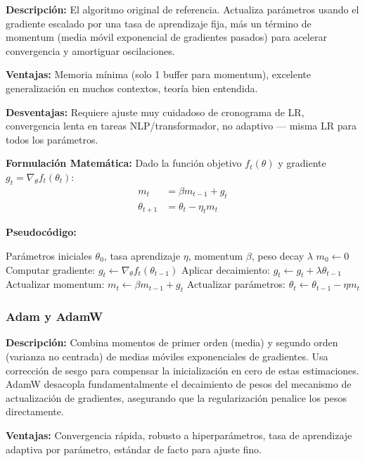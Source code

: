 \documentclass[11pt,a4paper]{article}
\begin{document}
\textbf{Descripción:} El algoritmo original de referencia. Actualiza parámetros usando el gradiente escalado por una tasa de aprendizaje fija, más un término de momentum (media móvil exponencial de gradientes pasados) para acelerar convergencia y amortiguar oscilaciones.

\textbf{Ventajas:} Memoria mínima (solo 1 buffer para momentum), excelente generalización en muchos contextos, teoría bien entendida.

\textbf{Desventajas:} Requiere ajuste muy cuidadoso de cronograma de LR, convergencia lenta en tareas NLP/transformador, no adaptivo — misma LR para todos los parámetros.

\textbf{Formulación Matemática:} Dado la función objetivo $f_t(\theta)$ y gradiente $g_t = \nabla_\theta f_t(\theta_t)$:
\begin{align}
m_t &= \beta m_{t-1} + g_t \\
\theta_{t+1} &= \theta_t - \eta_t m_t
\end{align}

\textbf{Pseudocódigo:}
\begin{algorithm}
\caption{SGD con Momentum}
\begin{algorithmic}[1]
\Require Parámetros iniciales $\theta_0$, tasa aprendizaje $\eta$, momentum $\beta$, peso decay $\lambda$
\State $m_0 \gets 0$
\State Computar gradiente: $g_t \gets \nabla_\theta f_t(\theta_{t-1})$
\State Aplicar decaimiento: $g_t \gets g_t + \lambda \theta_{t-1}$
\State Actualizar momentum: $m_t \gets \beta m_{t-1} + g_t$
\State Actualizar parámetros: $\theta_t \gets \theta_{t-1} - \eta m_t$
\EndFor
\end{algorithmic}
\end{algorithm}

\subsubsection{Adam y AdamW}

\textbf{Descripción:} Combina momentos de primer orden (media) y segundo orden (varianza no centrada) de medias móviles exponenciales de gradientes. Usa corrección de sesgo para compensar la inicialización en cero de estas estimaciones. AdamW desacopla fundamentalmente el decaimiento de pesos del mecanismo de actualización de gradientes, asegurando que la regularización penalice los pesos directamente.

\textbf{Ventajas:} Convergencia rápida, robusto a hiperparámetros, tasa de aprendizaje adaptiva por parámetro, estándar de facto para ajuste fino.
\end{document}
